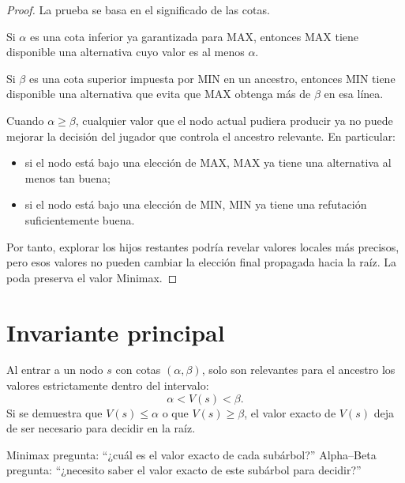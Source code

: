 \begin{proof}
La prueba se basa en el significado de las cotas.

Si $\alpha$ es una cota inferior ya garantizada para MAX, entonces MAX tiene disponible una alternativa cuyo valor es al menos $\alpha$.

Si $\beta$ es una cota superior impuesta por MIN en un ancestro, entonces MIN tiene disponible una alternativa que evita que MAX obtenga más de $\beta$ en esa línea.

Cuando $\alpha\ge\beta$, cualquier valor que el nodo actual pudiera producir ya no puede mejorar la decisión del jugador que controla el ancestro relevante. En particular:
\begin{itemize}
\item si el nodo está bajo una elección de MAX, MAX ya tiene una alternativa al menos tan buena;
\item si el nodo está bajo una elección de MIN, MIN ya tiene una refutación suficientemente buena.
\end{itemize}

Por tanto, explorar los hijos restantes podría revelar valores locales más precisos, pero esos valores no pueden cambiar la elección final propagada hacia la raíz. La poda preserva el valor Minimax.
\end{proof}

\section{Invariante principal}

\begin{invariant}
Al entrar a un nodo $s$ con cotas $(\alpha,\beta)$, solo son relevantes para el ancestro los valores estrictamente dentro del intervalo:
\[
\alpha < V(s) < \beta.
\]
Si se demuestra que $V(s)\le \alpha$ o que $V(s)\ge \beta$, el valor exacto de $V(s)$ deja de ser necesario para decidir en la raíz.
\end{invariant}

\begin{summarybox}
Minimax pregunta: ``¿cuál es el valor exacto de cada subárbol?'' Alpha--Beta pregunta: ``¿necesito saber el valor exacto de este subárbol para decidir?''
\end{summarybox}
